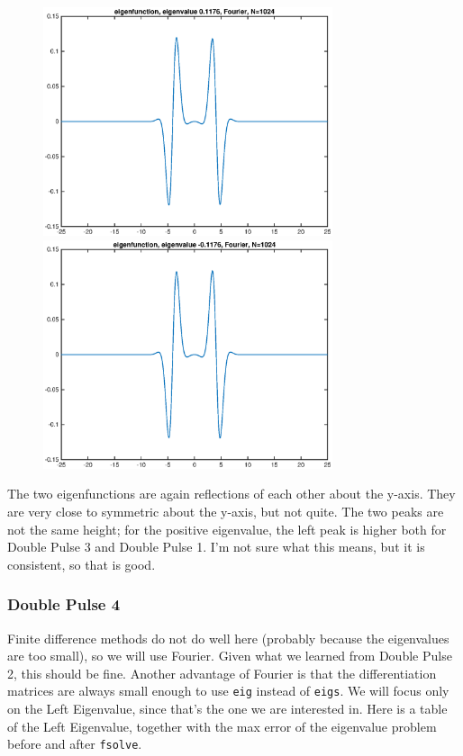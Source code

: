 \documentclass[12pt]{article}
\begin{document}
\begin{figure}[H]
\includegraphics[width=8.5cm]{1double3fouriereigenfnplus}
\includegraphics[width=8.5cm]{1double3fouriereigenfnminus}
\end{figure}
The two eigenfunctions are again reflections of each other about the y-axis. They are very close to symmetric about the y-axis, but not quite. The two peaks are not the same height; for the positive eigenvalue, the left peak is higher both for Double Pulse 3 and Double Pulse 1. I'm not sure what this means, but it is consistent, so that is good.

\subsubsection*{Double Pulse 4}
Finite difference methods do not do well here (probably because the eigenvalues are too small), so we will use Fourier. Given what we learned from Double Pulse 2, this should be fine. Another advantage of Fourier is that the differentiation matrices are always small enough to use \texttt{eig} instead of \texttt{eigs}. We will focus only on the Left Eigenvalue, since that's the one we are interested in. Here is a table of the Left Eigenvalue, together with the max error of the eigenvalue problem before and after \texttt{fsolve}.
\end{document}
